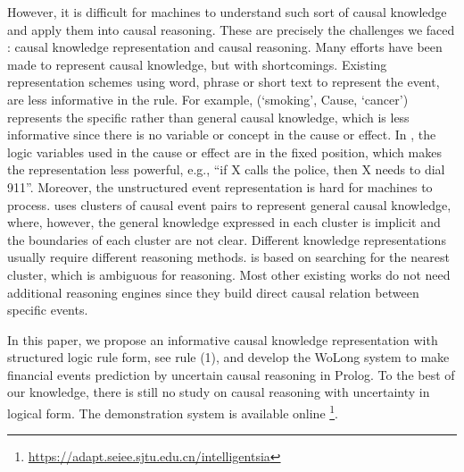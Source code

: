 However, it is difficult for machines to understand such sort of causal knowledge and apply them into causal reasoning. 
These are precisely the challenges we faced : causal knowledge representation and causal reasoning.
Many efforts have been made to represent causal knowledge, but with shortcomings. Existing representation schemes\cite{Zhao2017,Luo2016a,Speer2016} using word, phrase or short text to represent the event, are less informative in the rule. For example, (`smoking', Cause, `cancer') represents the specific rather than general causal knowledge, which is less informative since there is no variable or concept in the cause or effect. In \cite{sap2018atomic}, the logic variables used in the cause or effect are in the fixed position, which makes the representation less powerful, e.g., ``if X calls the police, then X needs to dial 911''. Moreover, the unstructured event representation is hard for machines to process. \cite{Radinsky2012} uses clusters of causal event pairs to represent general causal knowledge, where, however, the general knowledge expressed in each cluster is implicit and the boundaries of each cluster are not clear.
Different knowledge representations usually require different reasoning methods.
\cite{Radinsky2012} is based on searching for the nearest cluster, which is ambiguous for reasoning. Most other existing works do not need additional reasoning engines since they build direct causal relation between specific events.

In this paper, we propose an informative causal knowledge representation with structured logic rule form, see rule (1), and develop the WoLong system to make financial events prediction by uncertain causal reasoning in Prolog. To the best of our knowledge, there is still no study on causal reasoning with uncertainty in logical form. The demonstration system is available online \footnote{\url{https://adapt.seiee.sjtu.edu.cn/intelligentsia}}.


